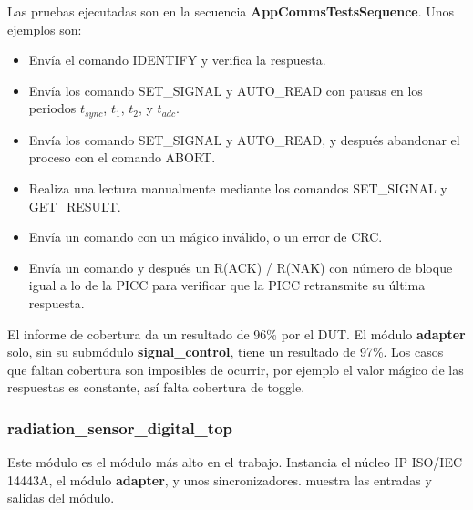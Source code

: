 \documentclass[a4paper, twoside, 11pt]{report}
\begin{document}
Las pruebas ejecutadas son en la secuencia \textbf{AppCommsTestsSequence}. Unos ejemplos son:

\begin{itemize}
  \item Envía el comando IDENTIFY y verifica la respuesta.
  \item Envía los comando SET\_SIGNAL y AUTO\_READ con pausas en los periodos $t_{sync}$, $t_1$, $t_2$, y $t_{adc}$.
  \item Envía los comando SET\_SIGNAL y AUTO\_READ, y después abandonar el proceso con el comando ABORT.
  \item Realiza una lectura manualmente mediante los comandos SET\_SIGNAL y GET\_RESULT.
  \item Envía un comando con un mágico inválido, o un error de CRC.
  \item Envía un comando y después un R(ACK) / R(NAK) con número de bloque igual a lo de la PICC para verificar que la PICC retransmite su última respuesta.
\end{itemize}

El informe de cobertura da un resultado de 96\% por el DUT. El módulo \textbf{adapter} solo, sin su submódulo \textbf{signal\_control}, tiene un resultado de 97\%. Los casos que faltan cobertura son imposibles de ocurrir, por ejemplo el valor mágico de las respuestas es constante, así falta cobertura de toggle.

\FloatBarrier
\subsubsection{radiation\_sensor\_digital\_top}

Este módulo es el módulo más alto en el trabajo. Instancia el núcleo IP ISO/IEC 14443A, el módulo \textbf{adapter}, y unos sincronizadores.  muestra las entradas y salidas del módulo.
\end{document}
